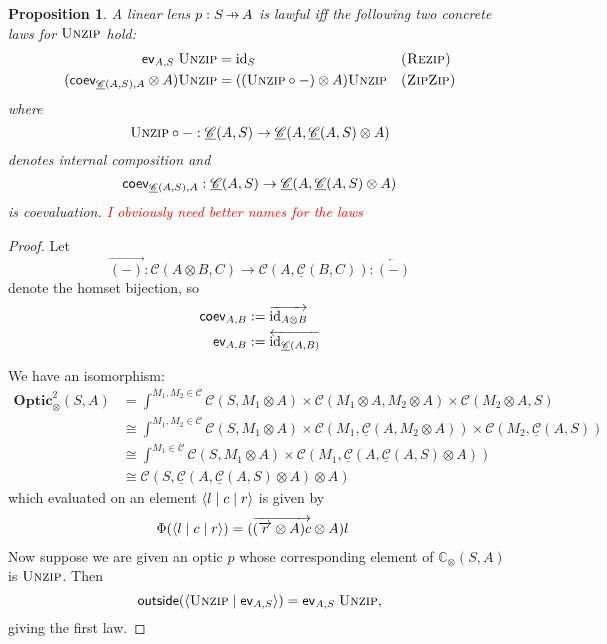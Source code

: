 \documentclass[11pt,letterpaper]{article}
\theoremstyle{plain}
\newtheorem{proposition}[theorem]{Proposition}
\theoremstyle{definition}
\newcommand{\C}{\mathscr{C}}
\newcommand{\homC}{\underline{\C}}
\newcommand{\Twoptic}{\mathbf{Optic}^2}
\newcommand{\conc}{\mathbb{C}}
\newcommand{\id}{\mathrm{id}}
\newcommand{\rep}[2]{{\ensuremath \left\langle #1 \mid #2 \right\rangle}}
\newcommand{\repthree}[3]{{\ensuremath \langle #1 \mid #2 \mid #3 \rangle}}
\newcommand{\funzip}{\textsc{Unzip}}
\newcommand{\outside}{\mathsf{outside}}
\newcommand{\hto}{\ensuremath{\,\mathaccent\shortmid\rightarrow\,}}
\newcommand{\todo}[1]{\textcolor{red}{\small #1}}
\begin{document}
\begin{proposition}\label{prop:concrete-linear-lawful}
  A linear lens $p : S \hto A$ is lawful iff the following two concrete laws for $\funzip$ hold:
  \begin{align*}
    \ev_{A, S} \; \funzip &= \id_S && \textsc{(Rezip)} \\
    (\coev_{\homC(A, S), A} \otimes A)\funzip &= ((\funzip \circ -) \otimes A)\funzip && \textsc{(ZipZip)}
  \end{align*}
  where \[ \funzip \circ - : \homC(A, S) \to \homC(A, \homC(A, S) \otimes A) \] denotes internal composition and \[\coev_{\homC(A, S), A} : \homC(A, S) \to \homC(A, \homC(A, S) \otimes A)\] is coevaluation.
  \todo{I obviously need better names for the laws}
\end{proposition}
\begin{proof}
  Let \[\overrightarrow{(-)} : \C(A \otimes B, C) \to \C(A, \homC(B, C)) : \overleftarrow{(-)}\] denote the homset bijection, so 
  \begin{align*}
    \coev_{A, B} &:= \overrightarrow{\id_{A \otimes B}} \\
    \ev_{A, B} &:= \overleftarrow{\id_{\homC(A, B)}}
  \end{align*}

  We have an isomorphism:
  \begin{align*}
  \Twoptic_\otimes(S, A)
    &= \int^{M_1, M_2 \in \C} \C(S, M_1 \otimes A) \times \C(M_1 \otimes A, M_2 \otimes A) \times \C(M_2 \otimes A, S) \\
    &\cong \int^{M_1, M_2 \in \C} \C(S, M_1 \otimes A) \times \C(M_1, \homC(A, M_2 \otimes A)) \times \C(M_2, \homC(A, S)) \\
    &\cong \int^{M_1 \in \C} \C(S, M_1 \otimes A) \times \C(M_1, \homC(A, \homC(A, S) \otimes A)) \\
    &\cong \C(S, \homC(A, \homC(A, S) \otimes A) \otimes A)
  \end{align*}
  which evaluated on an element $\repthree{l}{c}{r}$ is given by
  \begin{align*}
    \Phi(\repthree{l}{c}{r}) &= (\overrightarrow{(\overrightarrow{r} \otimes A)c} \otimes A)l
  \end{align*}
  Now suppose we are given an optic $p$ whose corresponding element of $\conc_\otimes(S, A)$ is $\funzip$. Then \[\outside(\rep{\funzip}{\ev_{A, S} }) = \ev_{A, S} \; \funzip,\] giving the first law.


\end{proof}
\end{document}
